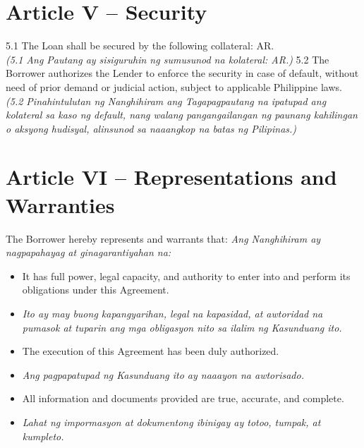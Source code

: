 \documentclass[a4paper,12pt]{article}
\begin{document}
\section*{Article V – Security}
5.1 The Loan shall be secured by the following collateral: AR. \\
\textit{(5.1 Ang Pautang ay sisiguruhin ng sumusunod na kolateral: AR.)}
5.2 The Borrower authorizes the Lender to enforce the security in case of default, without need of prior demand or judicial action, subject to applicable Philippine laws. \\
\textit{(5.2 Pinahintulutan ng Nanghihiram ang Tagapagpautang na ipatupad ang kolateral sa kaso ng default, nang walang pangangailangan ng paunang kahilingan o aksyong hudisyal, alinsunod sa naaangkop na batas ng Pilipinas.)}
\section*{Article VI – Representations and Warranties}
The Borrower hereby represents and warrants that:
\textit{Ang Nanghihiram ay nagpapahayag at ginagarantiyahan na:}
\begin{itemize}
\item It has full power, legal capacity, and authority to enter into and perform its obligations under this Agreement.
\item \textit{Ito ay may buong kapangyarihan, legal na kapasidad, at awtoridad na pumasok at tuparin ang mga obligasyon nito sa ilalim ng Kasunduang ito.}
\item The execution of this Agreement has been duly authorized.
\item \textit{Ang pagpapatupad ng Kasunduang ito ay naaayon na awtorisado.}
\item All information and documents provided are true, accurate, and complete.
\item \textit{Lahat ng impormasyon at dokumentong ibinigay ay totoo, tumpak, at kumpleto.}
\end{itemize}
\end{document}
